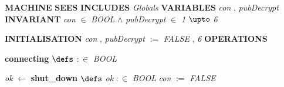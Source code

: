 %
\bsetindent
\begin{tabbing}
\bSetTabs
%
%
\bbnl
{\bf MACHINE} \bhsp{} \-\label{ATM}
%
%
\bbnl
{\bf SEES} \label{Bool_TYPE}
%
%
\bbnl
{\bf INCLUDES} \+ \bbnl
{\em Globals\/}\label{Globals}  \-
%
%
\bbnl
{\bf VARIABLES} \+ \bbnl
{\em con\/}\label{con}  , {\em pubDecrypt\/}\label{pubDecrypt}  \-
%
%
\bbnl
{\bf INVARIANT} \+ \bbnl
{\em con\/} $\in$ {\em BOOL\/}\label{BOOL}  $\wedge$ \bnl
{\em pubDecrypt\/} $\in$ {\em 1\/} $\upto$ {\em 6\/}
\end{tabbing}
\bresetindent
%
%
\vspace{-4.5ex}\bsetindent
\begin{tabbing}
\bSetTabs
\+\> \-
%
%
\bbnl
{\bf INITIALISATION} \+ \bbnl
{\em con\/} , {\em pubDecrypt\/} $:=$  {\em FALSE\/} , {\em 6\/} \-
%
%
\bnl\bnl
{\bf OPERATIONS} \+ \bbnl

%
%
{\bf { connecting}}  \bhsp $\defs$ \bhsp {} $:\in$ {\em BOOL\/}\label{BOOL}  \- \bOperationSemiColon 
\end{tabbing}
\bresetindent
%
%
\vspace{-4.5ex}\bsetindent
\begin{tabbing}
\bSetTabs
\+\>
%
%
{\em ok\/} $\longleftarrow$  {\bf { shut\_down}}  \bhsp $\defs$ \+ \bnl
  \+\bnl
{\em ok\/} $:\in$ {\em BOOL\/}\label{BOOL}  \bparallel \bnl
{\em con\/} $:=$  {\em FALSE\/} \-\bnl
{}  \- \bOperationSemiColon 
\end{tabbing}
\bresetindent
%
%
